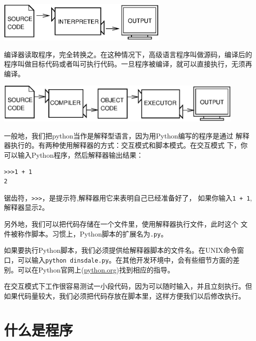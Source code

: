 \documentclass[10pt]{book}
\begin{document}
\beforefig
\centerline{\includegraphics[height=0.77in]{figs/interpret.eps}}
\afterfig


编译器读取程序，完全转换之。在这种情况下，高级语言程序叫做源码，编译后的程序叫做目标代码或者叫可执行代码。一旦程序被编译，就可以直接执行，无须再编译。

\beforefig
\centerline{\includegraphics[height=0.77in]{figs/compile.eps}}
\afterfig

一般地，我们把python当作是解释型语言，因为用Python编写的程序是通过
解释器执行的。有两种使用解释器的方式：交互模式和脚本模式。在交互模式
下，你可以输入Python程序，然后解释器输出结果：


\beforeverb
\begin{verbatim}    
>>>1 + 1
2
\end{verbatim} %
\afterverb

锯齿符，{\tt >>>}，是提示符,解释器用它来表明自己已经准备好了，
如果你输入{\tt 1 + 1},解释器显示{\tt 2}。\\


另外地，我们可以把代码存储在一个文件里，使用解释器执行文件，此时这个
文件被称作脚本。习惯上，Python脚本的扩展名为{\tt .py}。


如果要执行Python脚本，我们必须提供给解释器脚本的文件名。在UNIX命令窗口，可以输入{\tt python dinsdale.py}。在其他开发环境中，会有些细节方面的差别。可以在Python官网上(\url{python.org})找到相应的指导。


在交互模式下工作很容易测试一小段代码，因为可以随时输入，并且立刻执行。但如果代码量较大，我们必须把代码存放在脚本里，这样方便我们以后修改执行。 

\section{什么是程序}
\end{document}
